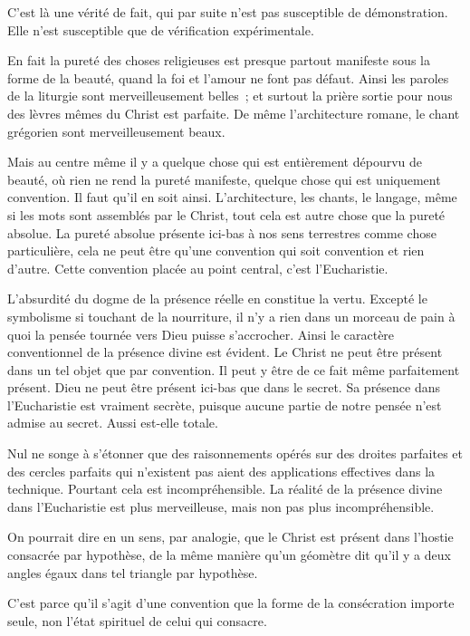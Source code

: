 \documentclass[french,twoside]{book} %
\begin{document}
C'est là une vérité de fait, qui par suite n'est pas susceptible de démonstration. Elle n'est susceptible que de vérification expérimentale.\par
En fait la pureté des choses religieuses est presque partout manifeste sous la forme de la beauté, quand la foi et l'amour ne font pas défaut. Ainsi les paroles de la liturgie sont merveilleusement belles ; et surtout la prière sortie pour nous des lèvres mêmes du Christ est parfaite. De même l'architecture romane, le chant grégorien sont merveilleusement beaux.\par
Mais au centre même il y a quelque chose qui est entièrement dépourvu de beauté, où rien ne rend la pureté manifeste, quelque chose qui est uniquement convention. Il faut qu'il en soit ainsi. L'architecture, les chants, le langage, même si les mots sont assemblés par le Christ, tout cela est autre chose que la pureté absolue. La pureté absolue présente ici-bas à nos sens terrestres comme chose particulière, cela ne peut être qu'une convention qui soit convention et rien d'autre. Cette convention placée au point central, c'est l'Eucharistie.\par
L'absurdité du dogme de la présence réelle en constitue la vertu. Excepté le symbolisme si touchant de la nourriture, il n'y a rien dans un morceau de pain à quoi la pensée tournée vers Dieu puisse s'accrocher. Ainsi le caractère conventionnel de la présence divine est évident. Le Christ ne peut être présent dans un tel objet que par convention. Il peut y être de ce fait même parfaitement présent. Dieu ne peut être présent ici-bas que dans le secret. Sa présence dans l'Eucharistie est vraiment secrète, puisque aucune partie de notre pensée n'est admise au secret. Aussi est-elle totale.\par
Nul ne songe à s'étonner que des raisonnements opérés sur des droites parfaites et des cercles parfaits qui n'existent pas aient des applications effectives dans la technique. Pourtant cela est incompréhensible. La réalité de la présence divine dans l'Eucharistie est plus merveilleuse, mais non pas plus incompréhensible.\par
On pourrait dire en un sens, par analogie, que le Christ est présent dans l'hostie consacrée par hypothèse, de la même manière qu'un géomètre dit qu'il y a deux angles égaux dans tel triangle par hypothèse.\par
C'est parce qu'il s'agit d'une convention que la forme de la consécration importe seule, non l'état spirituel de celui qui consacre.\par
\end{document}

